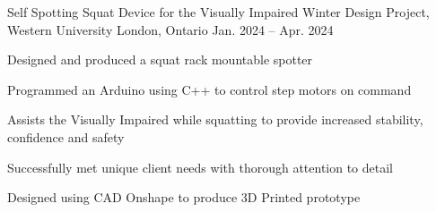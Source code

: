 

\begin{cventries}

  \cventry
    {Self Spotting Squat Device for the Visually Impaired} %
    {Winter Design Project, Western University} %
    {London, Ontario} %
    {Jan. 2024 -- Apr. 2024} %
    {
      \begin{cvitems} %
        \item {Designed and produced a squat rack mountable spotter}
        \item {Programmed an Arduino using C++ to control step motors on command}
        \item {Assists the Visually Impaired while squatting to provide increased stability, confidence and safety}
        \item {Successfully met unique client needs with thorough attention to detail}
        \item {Designed using CAD Onshape to produce 3D Printed prototype}
      \end{cvitems}
    }


\end{cventries}
